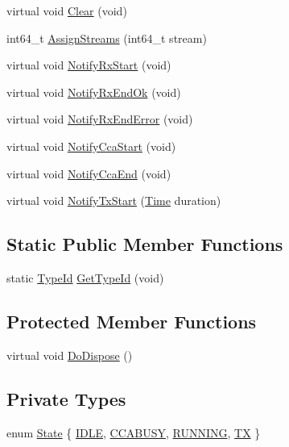\begin{DoxyCompactItemize}
\item 
virtual void \hyperlink{classns3_1_1UanMacCw_a65649a3af989315bbb25a4bedc46e868}{Clear} (void)
\item 
int64\+\_\+t \hyperlink{classns3_1_1UanMacCw_adcffebd9df36f178be11570180622b18}{Assign\+Streams} (int64\+\_\+t stream)
\item 
virtual void \hyperlink{classns3_1_1UanMacCw_a02fc40989760fcab9cb27eb020c1606c}{Notify\+Rx\+Start} (void)
\item 
virtual void \hyperlink{classns3_1_1UanMacCw_a1aa92f0820bc14f573abbe11057cfdfc}{Notify\+Rx\+End\+Ok} (void)
\item 
virtual void \hyperlink{classns3_1_1UanMacCw_a0f26d94d52dfb50b4e9efc42e39b9548}{Notify\+Rx\+End\+Error} (void)
\item 
virtual void \hyperlink{classns3_1_1UanMacCw_a87acb273ecb60f4f4f47ff1be95e255a}{Notify\+Cca\+Start} (void)
\item 
virtual void \hyperlink{classns3_1_1UanMacCw_a45fd40e595f6a5636882a2aba1f7204e}{Notify\+Cca\+End} (void)
\item 
virtual void \hyperlink{classns3_1_1UanMacCw_a1b2946271fb366ede005bd76d8a841ec}{Notify\+Tx\+Start} (\hyperlink{classns3_1_1Time}{Time} duration)
\end{DoxyCompactItemize}
\subsection*{Static Public Member Functions}
\begin{DoxyCompactItemize}
\item 
static \hyperlink{classns3_1_1TypeId}{Type\+Id} \hyperlink{classns3_1_1UanMacCw_a300db491f9fe9a035b5782cbf4ee5dc3}{Get\+Type\+Id} (void)
\end{DoxyCompactItemize}
\subsection*{Protected Member Functions}
\begin{DoxyCompactItemize}
\item 
virtual void \hyperlink{classns3_1_1UanMacCw_a64b9ef9ec594d16715641f9e86400b90}{Do\+Dispose} ()
\end{DoxyCompactItemize}
\subsection*{Private Types}
\begin{DoxyCompactItemize}
\item 
enum \hyperlink{classns3_1_1UanMacCw_ac5de94c1ba7689bee84413babfe604af}{State} \{ \hyperlink{classns3_1_1UanMacCw_ac5de94c1ba7689bee84413babfe604afa4aaf404936c2c9dd3bb1e771e3f6d49b}{I\+D\+LE}, 
\hyperlink{classns3_1_1UanMacCw_ac5de94c1ba7689bee84413babfe604afac159430490e8986f9d7403ba95b8b887}{C\+C\+A\+B\+U\+SY}, 
\hyperlink{classns3_1_1UanMacCw_ac5de94c1ba7689bee84413babfe604afa983a422d69cc8fbc6bfc1d1baac01227}{R\+U\+N\+N\+I\+NG}, 
\hyperlink{classns3_1_1UanMacCw_ac5de94c1ba7689bee84413babfe604afab212070e682432ffd197ff6ccb137f9c}{TX}
 \}
\end{DoxyCompactItemize}
